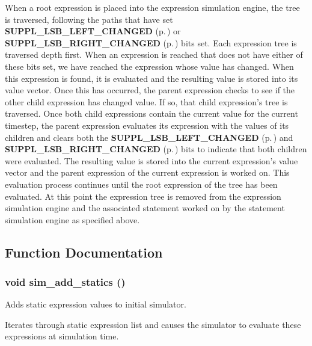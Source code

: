  When a root expression is placed into the expression simulation engine, the tree is traversed, following the paths that have set {\bf SUPPL\_\-LSB\_\-LEFT\_\-CHANGED} {\rm (p.\,\pageref{group__expr__suppl_a9})} or  {\bf SUPPL\_\-LSB\_\-RIGHT\_\-CHANGED} {\rm (p.\,\pageref{group__expr__suppl_a10})} bits set. Each expression tree is traversed depth first. When an  expression is reached that does not have either of these bits set, we have reached the expression whose value has changed. When this expression is found, it is evaluated and the resulting value is stored into its value vector. Once this has occurred, the parent expression checks to see if the other child expression has changed value. If so, that child expression's tree is traversed. Once both child expressions contain the current value for the current timestep, the parent expression evaluates its expression with the values of its children and clears both the {\bf SUPPL\_\-LSB\_\-LEFT\_\-CHANGED} {\rm (p.\,\pageref{group__expr__suppl_a9})} and {\bf SUPPL\_\-LSB\_\-RIGHT\_\-CHANGED} {\rm (p.\,\pageref{group__expr__suppl_a10})} bits to indicate that both children were evaluated. The resulting value is stored into the current expression's value vector and the parent expression of the current expression is worked on. This evaluation process continues until the root expression of the tree has been evaluated. At this point the expression tree is removed from the expression simulation engine and the associated statement worked on by the statement simulation engine as specified above.



\subsection{Function Documentation}
\subsubsection{\setlength{\rightskip}{0pt plus 5cm}void sim\_\-add\_\-statics ()}\label{sim_8c_a7}


Adds static expression values to initial simulator.

Iterates through static expression list and causes the simulator to evaluate these expressions at simulation time. 
